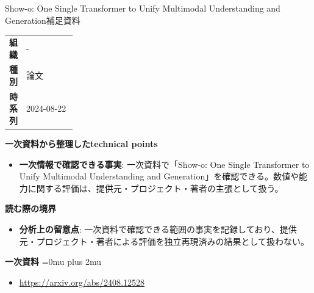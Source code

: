 \begin{technicalnote}{Show-o: One Single Transformer to Unify Multimodal Understanding and Generation}{補足資料}
\begingroup
\begin{tabularx}{\linewidth}{@{}>{\bfseries}p{0.22\linewidth}X@{}}
組織 & - \\
種別 & 論文 \\
時系列 & 2024-08-22 \\
\end{tabularx}
\smallskip
{\bfseries 一次資料から整理したtechnical points}
\begin{itemize}[leftmargin=1.5em,itemsep=0.35em]
\item \textbf{一次情報で確認できる事実}: 一次資料で「Show-o: One Single Transformer to Unify Multimodal Understanding and Generation」を確認できる。数値や能力に関する評価は、提供元・プロジェクト・著者の主張として扱う。
\end{itemize}
\begin{minipage}{\linewidth}
{\bfseries 読む際の境界}
\begin{itemize}[leftmargin=1.5em,itemsep=0.35em]
\item \textbf{分析上の留意点}: 一次資料で確認できる範囲の事実を記録しており、提供元・プロジェクト・著者による評価を独立再現済みの結果として扱わない。
\end{itemize}
\begin{samepage}
{\bfseries 一次資料}
\begingroup\sloppy
\Urlmuskip=0mu plus 2mu\relax
\begin{itemize}[leftmargin=1.5em,itemsep=0.25em]
\item {\scriptsize\url{https://arxiv.org/abs/2408.12528}}
\end{itemize}
\endgroup
\end{samepage}
\end{minipage}
\endgroup
\end{technicalnote}
\medskip


